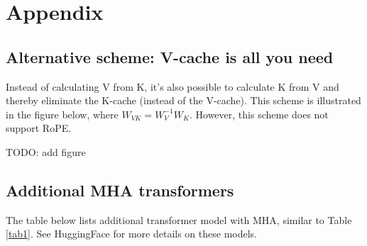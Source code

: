 \documentclass{article}
\begin{document}
\section*{Appendix}

\subsection*{Alternative scheme: V-cache is all you need}
Instead of calculating V from K, it's also possible to calculate K from V and thereby eliminate the K-cache (instead of the V-cache). This scheme is illustrated in the figure below, where $W_{VK} = W_V^{-1} W_K$. However, this scheme does not support RoPE.

TODO: add figure

\subsection*{Additional MHA transformers}
The table below lists additional transformer model with MHA, similar to Table \ref{tab1}. See HuggingFace for more details on these models.

\def\DeepSeekvl {\href{https://huggingface.co/deepseek-ai/deepseek-vl2-tiny}  {DeepSeek-vl2-tiny}}
\def\MiniCPM    {\href{https://huggingface.co/openbmb/MiniCPM-V-2}            {MiniCPM-V2}}
\def\UltraLM    {\href{https://huggingface.co/openbmb/UltraLM-65b}            {UltraLM-65B}}
\end{document}
